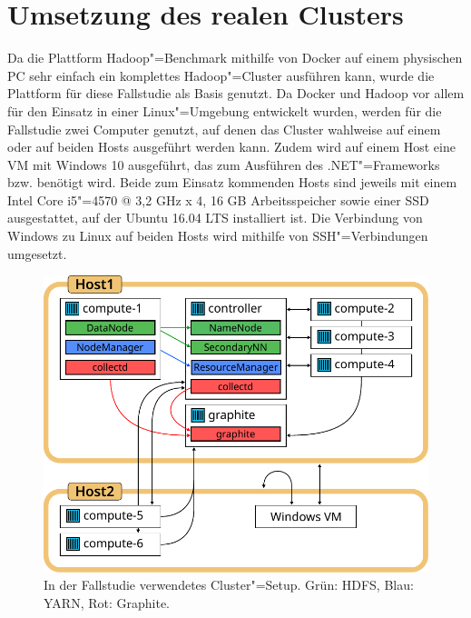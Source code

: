 \section{Umsetzung des realen Clusters}
\label{sec:aufbauCluster}

Da die Plattform Hadoop"=Benchmark mithilfe von Docker auf einem physischen PC sehr einfach ein komplettes Hadoop"=Cluster ausführen kann, wurde die Plattform für diese Fallstudie als Basis genutzt.
Da Docker und Hadoop vor allem für den Einsatz in einer Linux"=Umgebung entwickelt wurden, werden für die Fallstudie zwei Computer genutzt, auf denen das Cluster wahlweise auf einem oder auf beiden Hosts ausgeführt werden kann.
Zudem wird auf einem Host eine VM mit Windows 10 ausgeführt, das zum Ausführen des .NET"=Frameworks bzw. \sS benötigt wird.
Beide zum Einsatz kommenden Hosts sind jeweils mit einem Intel Core i5"=4570 @ 3,2 GHz x 4, 16 GB Arbeitsspeicher sowie einer SSD ausgestattet, auf der Ubuntu 16.04 LTS installiert ist.
Die Verbindung von Windows zu Linux auf beiden Hosts wird mithilfe von SSH"=Verbindungen umgesetzt.

\begin{figure}
    \includegraphics{./images/caseStudyHadoopSetup.pdf}
    \caption[In der Fallstudie verwendetes Cluster"=Setup]
    {In der Fallstudie verwendetes Cluster"=Setup.
        Grün: \ac{HDFS}, Blau: YARN, Rot: Graphite.}
    \label{fig:caseStudyHadoopSetup}
\end{figure}


